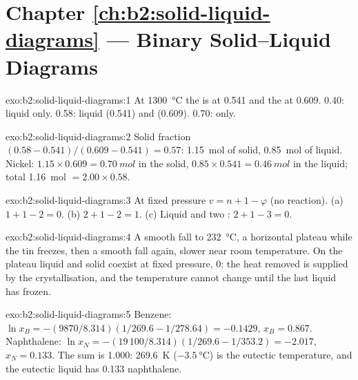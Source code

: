 \section*{Chapter \ref{ch:b2:solid-liquid-diagrams} --- Binary Solid--Liquid Diagrams}

\begin{solution}{exo:b2:solid-liquid-diagrams:1}
At \qty{1300}{\degreeCelsius} the  is at 0.541 and the  at 0.609.
0.40: liquid only. 0.58: liquid (0.541) and  (0.609). 0.70:
 only.
\end{solution}

\begin{solution}{exo:b2:solid-liquid-diagrams:2}
Solid fraction $(0.58 - 0.541)/(0.609 - 0.541) = 0.57$: \qty{1.15}{mol} of solid,
\qty{0.85}{mol} of liquid. Nickel: $1.15 \times 0.609 = \qty{0.70}{mol}$ in the
solid, $0.85 \times 0.541 = \qty{0.46}{mol}$ in the liquid; total \qty{1.16}{mol}
$= 2.00 \times 0.58$.
\end{solution}

\begin{solution}{exo:b2:solid-liquid-diagrams:3}
At fixed pressure $v = n + 1 - \varphi$ (no reaction). (a) $1 + 1 - 2 = 0$.
(b) $2 + 1 - 2 = 1$. (c) Liquid and two : $2 + 1 - 3 = 0$.
\end{solution}

\begin{solution}{exo:b2:solid-liquid-diagrams:4}
A smooth fall to \qty{232}{\degreeCelsius}, a horizontal plateau while the tin
freezes, then a smooth fall again, slower near room temperature. On the
plateau liquid and solid coexist at fixed pressure,  0: the heat
removed is supplied by the crystallisation, and the temperature cannot change
until the last liquid has frozen.
\end{solution}

\begin{solution}{exo:b2:solid-liquid-diagrams:5}
Benzene: $\ln x_B = -(9870/8.314)(1/269.6 - 1/278.64) = -0.1429$, $x_B =
0.867$. Naphthalene: $\ln x_N = -(19\,100/8.314)(1/269.6 - 1/353.2) = -2.017$,
$x_N = 0.133$. The sum is 1.000: \qty{269.6}{K} ($\qty{-3.5}{\degreeCelsius}$) is
the eutectic temperature, and the eutectic liquid has 0.133 naphthalene.
\end{solution}

